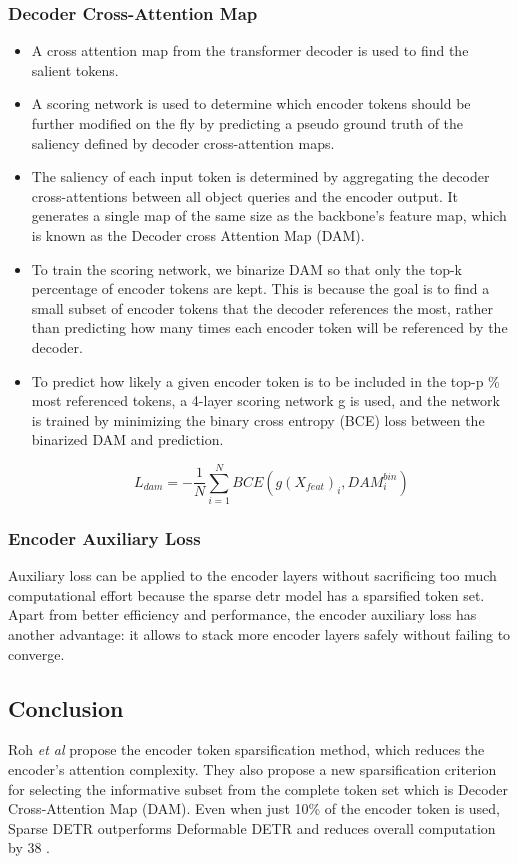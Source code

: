 \subsubsection{Decoder Cross-Attention Map}
\begin{itemize}
	\item A cross attention map from the transformer decoder is used to find the salient tokens.
	\item A scoring network is used to determine which encoder tokens should be further modified on the fly by predicting a pseudo ground truth of the saliency defined by decoder cross-attention maps.
	\item The saliency of each input token is determined by aggregating the decoder cross-attentions between all object queries and the encoder output. It generates a single map of the same size as the backbone's feature map, which is known as the Decoder cross Attention Map (DAM).
	\item To train the scoring network, we binarize DAM so that only the top-k percentage of encoder tokens are kept. This is because the goal is to find a small subset of encoder tokens that the decoder references the most, rather than predicting how many times each encoder token will be referenced by the decoder.
	\item To predict how likely a given encoder token is to be included in the top-p \% most referenced tokens, a 4-layer scoring network g is used, and the network is trained by minimizing the binary cross entropy (BCE) loss between the binarized DAM and prediction.
	
	$$ L_{dam} = -\frac{1}{N}\displaystyle\sum\limits_{i=1}^N BCE(g(X_{feat})_i, DAM^{bin}_i) 
	$$
\end{itemize}

\subsubsection{Encoder Auxiliary Loss}
\par Auxiliary loss can be applied to the encoder layers without sacrificing too much computational effort because the sparse detr model has a sparsified token set. Apart from better efficiency and performance, the encoder auxiliary loss has another advantage: it allows to stack more encoder layers safely without failing to converge.


\subsection{Conclusion}
\par Roh \textit{et al} propose the encoder token sparsification method, which reduces the encoder's attention complexity. They also propose a new sparsification criterion for selecting the informative subset from the complete token set which is Decoder Cross-Attention Map (DAM). Even when just 10\% of the encoder token is used, Sparse DETR \cite{roh2021sparse} outperforms Deformable DETR and reduces overall computation by 38%
.